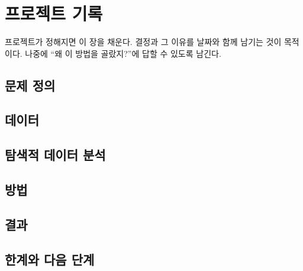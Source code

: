 \chapter{프로젝트 기록}
\label{ch:project}

\begin{aside}
프로젝트가 정해지면 이 장을 채운다. 결정과 그 이유를 날짜와 함께 남기는 것이
목적이다. 나중에 ``왜 이 방법을 골랐지?''에 답할 수 있도록 남긴다.
\end{aside}

\section{문제 정의}
\label{sec:proj-problem}

\section{데이터}
\label{sec:proj-data}

\section{탐색적 데이터 분석}
\label{sec:proj-eda}

\section{방법}
\label{sec:proj-method}

\section{결과}
\label{sec:proj-results}

\section{한계와 다음 단계}
\label{sec:proj-limits}
